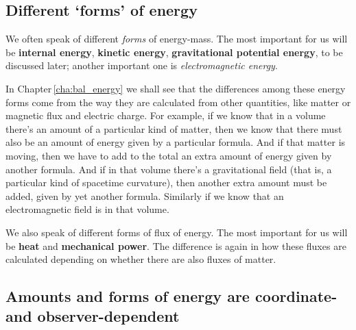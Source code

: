 \documentclass[a4paper,12pt,%
onecolumn,oneside,titlepage,%
british%
]{memoir}
\renewcommand*{\|}[1][]{\nonscript\:#1\vert\nonscript\:\mathopen{}}
\newcommand*{\chap}{Chapter}%
\newcommand*{\energym}{energy-mass}
\begin{document}
\subsection{Different \enquote*{forms} of energy}
\label{sec:forms_energy}

We often speak of different \emph{forms} of \energym. The most important for us will be \textbf{internal energy}, \textbf{kinetic energy}, \textbf{gravitational potential energy}, to be discussed later; another important one is \emph{electromagnetic energy}.

In \chap\,\ref{cha:bal_energy} we shall see that the differences among these energy forms come from the way they are calculated from other quantities, like matter or magnetic flux and electric charge. For example, if we know that in a volume there's an amount of a particular kind of matter, then we know that there must also be an amount of energy given by a particular formula. And if that matter is moving, then we have to add to the total an extra amount of energy given by another formula. And if in that volume there's a gravitational field (that is, a particular kind of spacetime curvature), then another extra amount must be added, given by yet another formula. Similarly if we know that an electromagnetic field is in that volume.

We also speak of different forms of flux of energy. The most important for us will be \textbf{heat} and \textbf{mechanical power}. The difference is again in how these fluxes are calculated depending on whether there are also fluxes of matter.

\subsection{Amounts and forms of energy are coordinate- and observer-dependent}
\label{sec:energy_coords}
\end{document}
